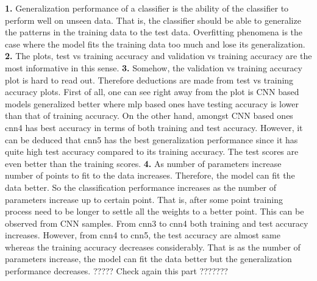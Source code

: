 \documentclass{assignment}
\begin{document}
\textbf{1.}
Generalization performance of a classifier is the ability of the classifier to perform well on unseen data. That is, the classifier should be able to generalize the patterns in the training data to the test data. Overfitting phenomena is the case where the model fits the training data too much and lose its generalization.
\textbf{2.}
The plots, test vs training accuracy and validation vs training accuracy are the most informative in this sense.
\textbf{3.}
Somehow, the validation vs training accuracy plot is hard to read out. Therefore deductions are made from test vs training accuracy plots. First of all, one can see right away from the plot is CNN based models generalized  better where mlp based ones have testing accuracy is lower than that of training accuracy. On the other hand, amongst CNN based ones cnn4 has best accuracy in terms of both training and test accuracy. However, it can be deduced that cnn5 has the best generalization performance since it has quite high test accuracy compared to its training accuracy. The test scores are even better than the training scores. 
\textbf{4.}
As number of parameters increase number of points to fit to the data increases. Therefore, the model can fit the data better. So the classification performance increases as the number of parameters increase up to certain point. That is, after some point training process need to be longer to settle all the weights to a better point. This can be observed from CNN samples. From cnn3 to cnn4 both training and test accuracy increases. However, from cnn4 to cnn5, the test accuracy are almost same whereas the training accuracy decreases considerably. That is as the number of parameters increase, the model can fit the data better but the generalization performance decreases. ????? Check again this part ???????
\end{document}
